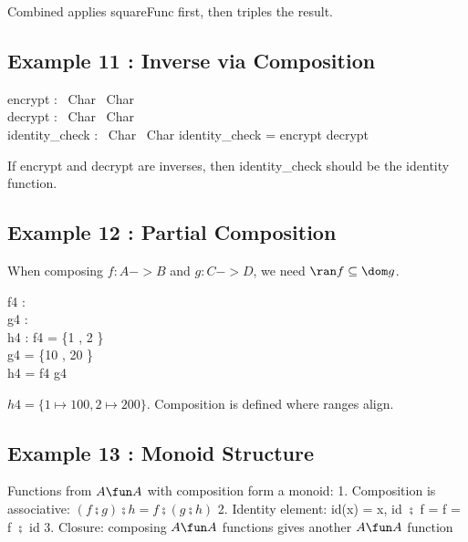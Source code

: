 \documentclass[a4paper,10pt,fleqn]{article}
\begin{document}
\noindent Combined applies squareFunc first, then triples the result.

\bigskip

\subsection*{Example 11 : Inverse via Composition}

\begin{axdef}
encrypt : \seq~Char \fun \seq~Char \\
decrypt : \seq~Char \fun \seq~Char \\
identity\_check : \seq~Char \fun \seq~Char
\where
identity\_check = encrypt \comp decrypt
\end{axdef}

\noindent If encrypt and decrypt are inverses, then identity\_check should be the identity function.

\bigskip

\subsection*{Example 12 : Partial Composition}

\noindent When composing $f : A -> B$ and $g : C -> D$, we need $\ran f \subseteq \dom g$.

\bigskip

\begin{axdef}
f4 : \nat \pfun \nat \\
g4 : \nat \pfun \nat \\
h4 : \nat \pfun \nat
\where
f4 = \{1 , 2 \} \\
g4 = \{10 , 20 \} \\
h4 = f4 \comp g4
\end{axdef}

\noindent $h4 = \{1 \mapsto 100, 2 \mapsto 200\}$. Composition is defined where ranges align.

\bigskip

\subsection*{Example 13 : Monoid Structure}

\noindent Functions from $A \fun A$ with composition form a monoid: 1. Composition is associative: $(f \semi g) \semi h = f \semi (g \semi h)$ 2. Identity element: id(x) = x, id $\semi$ f = f = f $\semi$ id 3. Closure: composing $A \fun A$ functions gives another $A \fun A$ function
\end{document}
